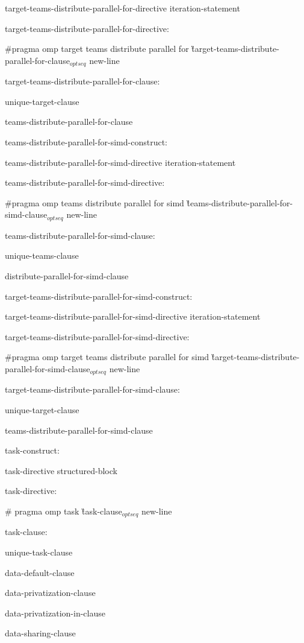 {\I target-teams-distribute-parallel-for-directive iteration-statement

target-teams-distribute-parallel-for-directive:

\C\I \#pragma omp target teams distribute parallel for \G target-teams-distribute-parallel-for-clause$_{optseq}$ new-line

target-teams-distribute-parallel-for-clause:

\I unique-target-clause

\I teams-distribute-parallel-for-clause

teams-distribute-parallel-for-simd-construct:

\I teams-distribute-parallel-for-simd-directive iteration-statement

teams-distribute-parallel-for-simd-directive:

\C\I \#pragma omp teams distribute parallel for simd \G teams-distribute-parallel-for-simd-clause$_{optseq}$ new-line

teams-distribute-parallel-for-simd-clause:

\I unique-teams-clause

\I distribute-parallel-for-simd-clause

target-teams-distribute-parallel-for-simd-construct:

\I target-teams-distribute-parallel-for-simd-directive iteration-statement

target-teams-distribute-parallel-for-simd-directive:

\C\I \#pragma omp target teams distribute parallel for simd \G target-teams-distribute-parallel-for-simd-clause$_{optseq}$ new-line

target-teams-distribute-parallel-for-simd-clause:

\I unique-target-clause

\I teams-distribute-parallel-for-simd-clause

task-construct:

\I task-directive structured-block

task-directive:

\C\I \# pragma omp task \G task-clause$_{optseq}$ new-line

task-clause:

\I unique-task-clause

\I data-default-clause

\I data-privatization-clause

\I data-privatization-in-clause

\I data-sharing-clause

}
